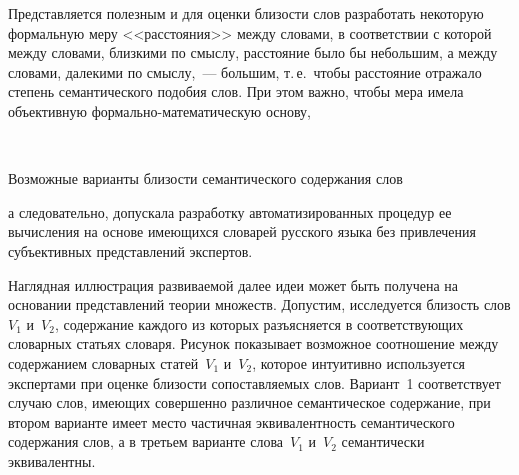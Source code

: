 \begin{multicols}{2}
     Представляется полезным и для оценки бли\-зости слов разработать 
некоторую формальную меру <<расстояния>> между словами, в соответствии с 
которой между словами, близкими по смыслу, расстояние было бы небольшим, 
а между словами, далекими по смыслу,~--- большим, т.\,е.\ чтобы расстояние 
отражало степень семантического подобия слов. При этом важно, чтобы мера 
имела объективную фор\-маль\-но-ма\-те\-ма\-ти\-че\-скую основу,\linebreak\vspace*{-12pt}


\pagebreak




\begin{center}  %
\vspace*{-3pt}
\mbox{%
 \epsfxsize=73.981mm
 }
 \end{center}
{\small{Возможные варианты близости семантического содержания слов}}



\vspace*{15pt}




\noindent
 а  следовательно, допускала разработку автоматизированных процедур ее 
вычисления на основе имеющихся словарей русского языка без привлечения 
субъективных представлений экспертов. 
     
     Наглядная иллюстрация развиваемой далее идеи может быть получена на 
основании пред\-став\-ле\-ний теории множеств. Допустим, исследуется близость 
слов $V_1$ и~$V_2$, содержание каждого из которых разъясняется в 
соответствующих словарных статьях словаря. Рисунок показывает возможное 
соотношение между содержанием словарных статей~$V_1$ и~$V_2$, которое 
интуитивно используется экспертами при оценке близости сопоставляемых 
слов. Вариант~1 соответствует случаю слов, име\-ющих совершенно различное 
семантическое содержание, при втором варианте имеет место частичная 
эквивалентность семантического содержания слов, а в третьем варианте 
слова~$V_1$ и~$V_2$ семантически эквивалентны. 
     



\end{multicols}
